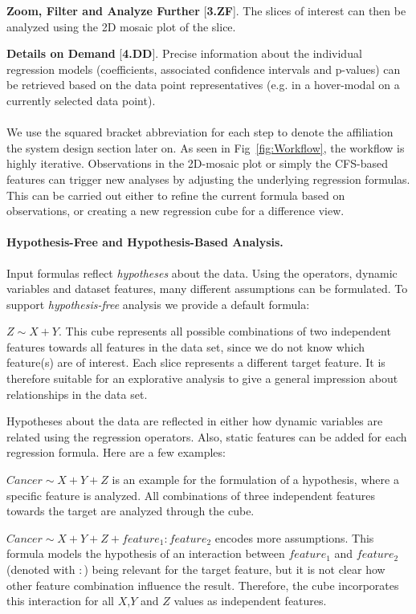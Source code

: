 \documentclass[journal]{style/vgtc} 			          %
\begin{document}
\textbf{Zoom, Filter and Analyze Further} [\textbf{3.ZF}]. The slices of interest can then be analyzed using the 2D mosaic plot of the slice.

\textbf{Details on Demand} [\textbf{4.DD}]. Precise information about the individual regression models (coefficients, associated confidence intervals and p-values) can be retrieved based on the data point representatives (e.g. in a hover-modal on a currently selected data point).
\\\\
We use the squared bracket abbreviation for each step to denote the affiliation the system design section later on.
As seen in Fig~\ref{fig:Workflow}, the workflow is highly iterative.
Observations in the 2D-mosaic plot or simply the CFS-based features can trigger new analyses by adjusting the underlying regression formulas.
This can be carried out either to refine the current formula based on observations, or creating a new regression cube for a difference view.
\paragraph{Hypothesis-Free and Hypothesis-Based Analysis.}
Input formulas reflect \emph{hypotheses} about the data.
Using the operators, dynamic variables and dataset features, many different assumptions can be formulated.
To support \emph{hypothesis-free} analysis we provide a default formula:

$Z \sim X + Y$.
This cube represents all possible combinations of two independent features towards all features in the data set, since we do not know which feature(s) are of interest.
Each slice represents a different target feature.
It is therefore suitable for an explorative analysis to give a general impression about relationships in the data set.

Hypotheses about the data are reflected in either how dynamic variables are related using the regression operators.
Also, static features can be added for each regression formula.
Here are a few examples:

$Cancer \sim X + Y + Z$ is an example for the formulation of a hypothesis, where a specific feature is analyzed.
All combinations of three independent features towards the target are analyzed through the cube.

$Cancer \sim X + Y + Z + feature_1:feature_2$ encodes more assumptions.
This formula models the hypothesis of an interaction between $feature_1$ and $feature_2$ (denoted with $:$) being relevant for the target feature, but it is not clear how other feature combination influence the result.
Therefore, the cube incorporates this interaction for all $X$,$Y$ and $Z$ values as independent features.
\end{document}
